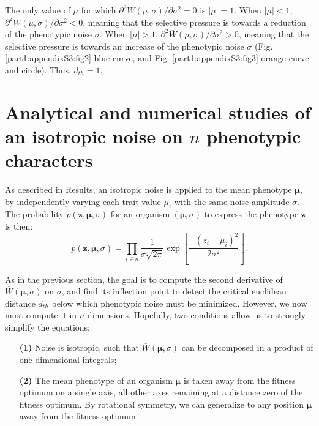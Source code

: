 The only value of $\mu$ for which $\partial^2 \overline{W}(\mu,\sigma)/\partial \sigma^2 = 0$ is $|\mu| = 1$. When $|\mu| < 1$, $\partial^2 \overline{W}(\mu,\sigma)/\partial \sigma^2 < 0$, meaning that the selective pressure is towards a reduction of the phenotypic noise $\sigma$. When $|\mu| > 1$, $\partial^2 \overline{W}(\mu,\sigma)/\partial \sigma^2 > 0$, meaning that the selective pressure is towards an increase of the phenotypic noise $\sigma$ (Fig. \ref{part1:appendixS3:fig2} blue curve, and Fig. \ref{part1:appendixS3:fig3} orange curve and circle). Thus, $d_{th}=1$.


\section*{Analytical and numerical studies of an isotropic noise on $n$ phenotypic characters}

As described in Results, an isotropic noise is applied to the mean phenotype $\boldsymbol{\mu}$, by independently varying each trait value $\mu_i$ with the same noise amplitude $\sigma$. The probability $p(\boldsymbol{z},\boldsymbol{\mu},\sigma)$ for an organism $(\boldsymbol{\mu}, \sigma)$ to express the phenotype $\boldsymbol{z}$ is then:
\begin{equation}
p(\boldsymbol{z},\boldsymbol{\mu},\sigma) = \prod_{i \in n} \dfrac{1}{\sigma \sqrt{2\pi}} \exp \left[ \dfrac{-(z_i-\mu_i)^2}{2\sigma^2} \right].
\end{equation}

As in the previous section, the goal is to compute the second derivative of $\overline{W}(\boldsymbol{\mu}, \sigma)$ on $\sigma$, and find its inflection point to detect the critical euclidean distance $d_{th}$ below which phenotypic noise must be minimized. However, we now must compute it in $n$ dimensions. Hopefully, two conditions allow us to strongly simplify the equations:
\begin{enumerate}
\item[\textbf{(1)}] Noise is isotropic, such that $\overline{W}(\boldsymbol{\mu}, \sigma)$ can be decomposed in a product of one-dimensional integrals;
\item[\textbf{(2)}] The mean phenotype of an organism $\boldsymbol{\mu}$ is taken away from the fitness optimum on a single axis, all other axes remaining at a distance zero of the fitness optimum. By rotational symmetry, we can generalize to any position $\boldsymbol{\mu}$ away from the fitness optimum.
\end{enumerate}

